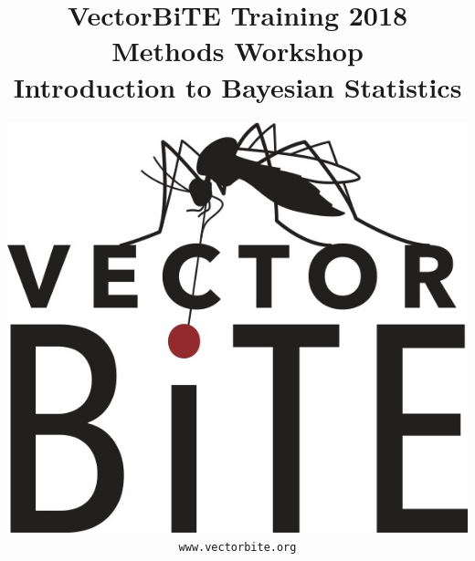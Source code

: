 \documentclass[12pt,xcolor=svgnames]{beamer}
\newcommand{\rd}{\color{red}}
\newcommand{\org}{\color{Orange}}
\newcommand{\gr}{\color{gray}}
\newcommand{\theme}{\color{FireBrick}}
\begin{document}
{ \usebackgroundtemplate{}%
\thispagestyle{empty}
\setcounter{page}{0}


\title{\theme \Large \vskip 0.5cm
{\bf VectorBiTE Training 2018 \\ Methods Workshop}\\
\bigskip
\bf {\sf \gr Introduction to Bayesian Statistics}}

\author{
\begin{center}
\includegraphics[scale=0.15,trim=10 10 0 150]{VB_logo}
\end{center}
\texttt{\rd\small www.vectorbite.org}
}
\date{}
\maketitle 
}
\end{document}

